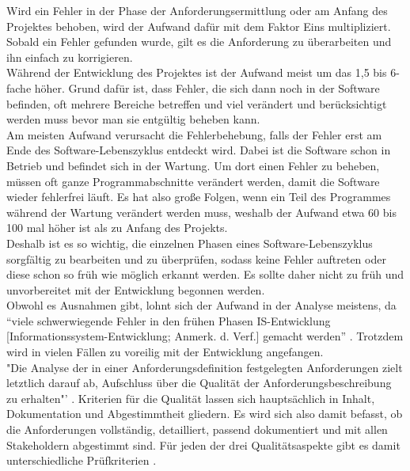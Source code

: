 \documentclass [12pt, a4paper, oneside, titlepage, ngerman]{article}
\begin{document}
\noindent Wird ein Fehler in der Phase der Anforderungsermittlung oder am Anfang des Projektes behoben, wird der Aufwand dafür mit dem Faktor Eins multipliziert. Sobald ein Fehler gefunden wurde, gilt es die Anforderung zu überarbeiten und ihn einfach zu korrigieren.\\
Während der Entwicklung des Projektes ist der Aufwand meist um das 1,5 bis 6-fache höher. Grund dafür ist, dass Fehler, die sich dann noch in der Software befinden, oft mehrere Bereiche betreffen und viel verändert und berücksichtigt werden muss bevor man sie entgültig beheben kann.\\
Am meisten Aufwand verursacht die Fehlerbehebung, falls der Fehler erst am Ende des Software-Lebenszyklus entdeckt wird. Dabei ist die Software schon in Betrieb und befindet sich in der Wartung. Um dort einen Fehler zu beheben, müssen oft ganze Programmabschnitte verändert werden, damit die Software wieder fehlerfrei läuft. Es hat also große Folgen, wenn ein Teil des Programmes während der Wartung verändert werden muss, weshalb der Aufwand etwa 60 bis 100 mal höher ist als zu Anfang des Projekts. \\
Deshalb ist es so wichtig, die einzelnen Phasen eines Software-Lebenszyklus sorgfältig zu bearbeiten und zu überprüfen, sodass keine Fehler auftreten oder diese schon so früh wie möglich erkannt werden. Es sollte daher nicht zu früh und unvorbereitet mit der Entwicklung begonnen werden.\\
Obwohl es Ausnahmen gibt, lohnt sich der Aufwand in der Analyse meistens, da "`viele schwerwiegende Fehler in den frühen Phasen IS-Entwicklung [Informationssystem-Entwicklung; Anmerk. d. Verf.] gemacht werden"' \cite[S.316]{Alpar2016}. Trotzdem wird in vielen Fällen zu voreilig mit der Entwicklung angefangen. \\
"Die Analyse der in einer Anforderungsdefinition festgelegten Anforderungen zielt letztlich darauf ab, Aufschluss über die Qualität der Anforderungsbeschreibung zu erhalten"' \cite[S.51]{partsch2010}. Kriterien für die Qualität lassen sich hauptsächlich in Inhalt, Dokumentation und Abgestimmtheit gliedern. Es wird sich also damit befasst, ob die Anforderungen vollständig, detailliert, passend dokumentiert und mit allen Stakeholdern abgestimmt sind. Für jeden der drei Qualitätsaspekte gibt es damit unterschiedliche Prüfkriterien \cite[vgl.][S.97]{PohlRupp2015}.
\end{document}

